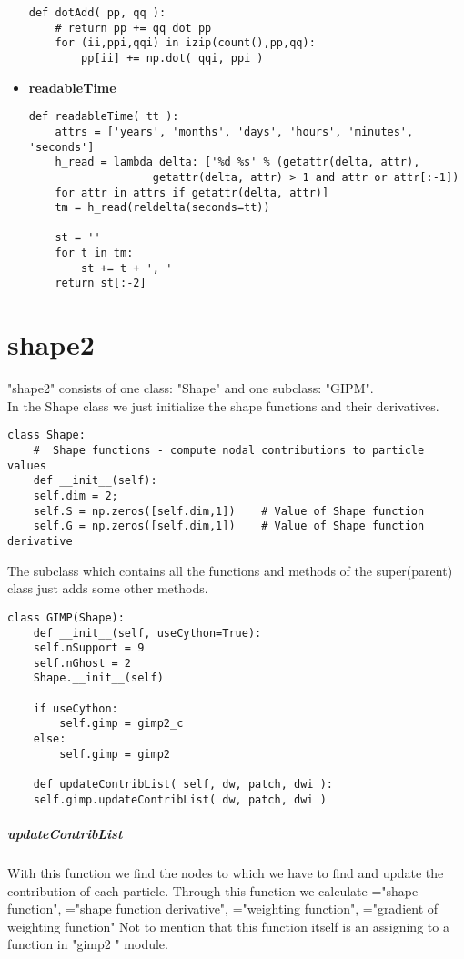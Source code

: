 \begin{itemize}
\begin{lstlisting}
def dotAdd( pp, qq ):
    # return pp += qq dot pp
    for (ii,ppi,qqi) in izip(count(),pp,qq):
        pp[ii] += np.dot( qqi, ppi )  
\end{lstlisting}
\item \textbf{readableTime}
\begin{lstlisting}
def readableTime( tt ):
    attrs = ['years', 'months', 'days', 'hours', 'minutes', 'seconds']    
    h_read = lambda delta: ['%d %s' % (getattr(delta, attr), 
                   getattr(delta, attr) > 1 and attr or attr[:-1]) 
    for attr in attrs if getattr(delta, attr)]
    tm = h_read(reldelta(seconds=tt))
    
    st = ''
    for t in tm:
        st += t + ', '
    return st[:-2]
\end{lstlisting}
\end{itemize}

\chapter{shape2}
\label{chap:shape2}
"shape2" consists of one class: "Shape" and one subclass: "GIPM". \\
In the Shape class we just initialize the shape functions and their derivatives. 
\begin{lstlisting}
class Shape:
    #  Shape functions - compute nodal contributions to particle values
    def __init__(self):
	self.dim = 2;
	self.S = np.zeros([self.dim,1])    # Value of Shape function
	self.G = np.zeros([self.dim,1])    # Value of Shape function derivative	     
\end{lstlisting}

The subclass which contains all the functions and methods of the super(parent) class just adds some other methods.
\begin{lstlisting}
class GIMP(Shape):
    def __init__(self, useCython=True):
	self.nSupport = 9
	self.nGhost = 2
	Shape.__init__(self)
	
	if useCython:
	    self.gimp = gimp2_c
	else:
	    self.gimp = gimp2

    def updateContribList( self, dw, patch, dwi ):
	self.gimp.updateContribList( dw, patch, dwi )
\end{lstlisting}

\paragraph{updateContribList}
With this function we find the nodes to which we have to find and update the contribution of each particle.
Through this function we calculate  ="shape function",  ="shape function derivative",  ="weighting function",  ="gradient of weighting function"
Not to mention that this function itself is an assigning to a function in "gimp2 " module.

